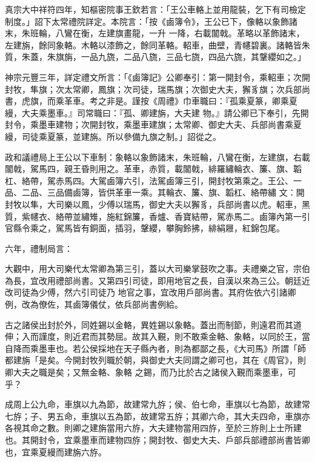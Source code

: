 \begin{pinyinscope}
 真宗大中祥符四年，知樞密院事王欽若言：「王公車輅上並用龍裝，乞下有司檢定制度。」詔下太常禮院詳定。本院言：「按《鹵簿令》，王公已下，像輅以象飾諸末，朱班輪，八鸞在衡，左建旗畫龍，一升
 一降，右載闟戟。革略以革飾諸末，左建旃，餘同象輅。木輅以漆飾之，餘同革輅。軺車，曲壁，青幰碧裏。諸輅皆朱質，朱蓋，朱旗旃，一品九旒，二品八旒，三品七旒，四品六旒，其鞶纓如之。」



 神宗元豐三年，詳定禮文所言：「《鹵簿記》公卿奉引：第一開封令，乘軺車；次開封牧，隼旗；次太常卿，鳳旗；次司徒，瑞馬旗；次御史大夫，獬豸旗；次兵部尚書，虎旗，而乘革車。考之非是。謹按《周禮》巾車職曰：『孤乘夏篆，卿乘夏縵，大夫乘墨車。』司常職曰：『孤、卿建旃，大夫建
 物。』請公卿已下奉引，先開封令，乘墨車建物；次開封牧，乘墨車建旗；太常卿、御史大夫、兵部尚書乘夏縵，司徒乘夏篆，並建旃。所以參備九旗之制。」詔從之。



 政和議禮局上王公以下車制：象輅以象飾諸末，朱班輪，八鸞在衡，左建旗，右載闟戟，駕馬四，親王昏則用之。革車，赤質，載闟戟，緋羅繡輪衣、簾、旗、韜杠、絡帶，駕赤馬四。大駕鹵簿六引，法駕鹵簿三引，開封牧第乘之。王公、一品、二品、三品備鹵簿，皆供革車一乘。其輪衣、簾、旗、韜杠、絡帶繡
 文：開封牧以隼，大司樂以鳳，少傅以瑞馬，御史大夫以獬豸，兵部尚書以虎。軺車，黑質，紫幰衣、絡帶並繡雉，施紅錦簾，香爐、香寶結帶，駕赤馬二。鹵簿內第一引官縣令乘之，駕馬皆有銅面，插羽，鞶纓，攀胸鈴拂，緋絹屜，紅錦包尾。



 六年，禮制局言：



 大觀中，用大司樂代太常卿為第三引，蓋以大司樂掌鼓吹之事。夫禮樂之官，宗伯為長，宜改用禮部尚書。又第四引司徒，即用地官之長，自漢以來為三公。朝廷近改司徒為少傅，然六引司徒乃
 地官之事，宜改用戶部尚書。其府佐依六引諸卿例，改為僚佐，其鹵簿儀仗，依兵部尚書例給。



 古之諸侯出封於外，同姓錫以金輅，異姓錫以象輅。蓋出而制節，則遠君而其道伸；入而謹度，則近君而其勢屈。故其入覲，則不敢乘金輅、象輅，以同於王，當自降而乘墨車也。若公侯採地在天子縣內者，則為都鄙之長，《大司馬》所謂「師都建旃「是矣。今開封牧列職於朝，與御史大夫同謂之卿可也，其在《周官》，則卿大夫之職是矣；又無金輅、象輅
 之錫，而乃比於古之諸侯入覲而乘墨車，可乎？



 成周上公九命，車旗以九為節，故建常九斿；侯、伯七命，車旗以七為節，故建常七斿；子、男五命，車旗以五為節，故建常五斿；其卿六命，其大夫四命，車旗亦各視其命之數。則卿之建旃當用六斿，大夫建物當用四斿，至於三斿則上士所建也。其開封令，宜乘墨車而建物四斿；開封牧、御史大夫、戶部兵部禮部尚書皆卿也，宜乘夏縵而建旃六斿。




\end{pinyinscope}
